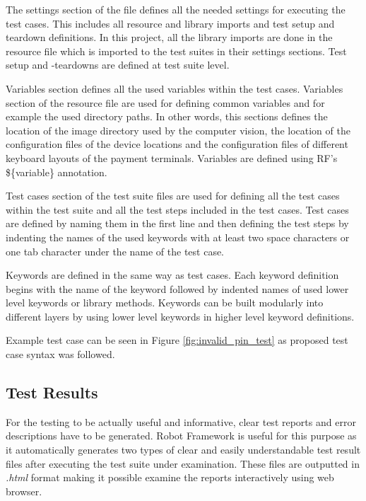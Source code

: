 The settings section of the file defines all the needed settings for executing the test cases. This includes all resource and library imports and test setup and teardown definitions. In this project, all the library imports are done in the resource file which is imported to the test suites in their settings sections. Test setup and -teardowns are defined at test suite level.

Variables section defines all the used variables within the test cases. Variables section of the resource file are used for defining common variables and for example the used directory paths. In other words, this sections defines the location of the image directory used by the computer vision, the location of the configuration files of the device locations and the configuration files of different keyboard layouts of the payment terminals. Variables are defined using RF's \$\{variable\} annotation.

Test cases section of the test suite files are used for defining all the test cases within the test suite and all the test steps included in the test cases. Test cases are defined by naming them in the first line and then defining the test steps by indenting the names of the used keywords with at least two space characters or one tab character under the name of the test case.
    
Keywords are defined in the same way as test cases. Each keyword definition begins with the name of the keyword followed by indented names of used lower level keywords or library methods. Keywords can be built modularly into different layers by using lower level keywords in higher level keyword definitions.

Example test case can be seen in Figure \ref{fig:invalid_pin_test} as proposed test case syntax was followed.

\subsection{Test Results}
\label{subsection:Test result syntax}

For the testing to be actually useful and informative, clear test reports and error descriptions have to be generated. Robot Framework is useful for this purpose as it automatically generates two types of clear and easily understandable test result files after executing the test suite under examination. These files are outputted in \emph{.html} format making it possible examine the reports interactively using web browser.

